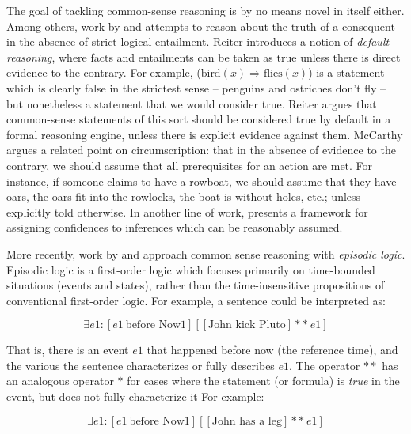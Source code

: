 The goal of tackling common-sense reasoning is by no means novel in
  itself either.
Among others, work by  and 
  attempts to reason about the truth of a consequent in the absence of strict logical entailment.
Reiter introduces a notion of \textit{default reasoning}, where facts and entailments can be
  taken as true unless there is direct evidence to the contrary.
For example,  ($\textrm{bird}(x) \Rightarrow \textrm{flies}(x)$) is a statement which
  is clearly false in the strictest sense -- penguins and ostriches don't fly -- but nonetheless
  a statement that we would consider true.
Reiter argues that common-sense statements of this sort should be considered true by default in
  a formal reasoning engine, unless there is explicit evidence against them.
McCarthy argues a related point on circumscription: that in the absence of evidence to the contrary,
  we should assume that all prerequisites for an action are met.
For instance, if someone claims to have a rowboat, we should assume that they have oars, the oars
  fit into the rowlocks, the boat is without holes, etc.; unless explicitly told otherwise.
In another line of work,  presents a framework for
  assigning confidences to inferences which can be reasonably assumed.

More recently, work by  and
   approach common sense reasoning
  with \textit{episodic logic}.
Episodic logic is a first-order logic which focuses primarily on time-bounded
  situations (events and states), rather than the time-insensitive propositions
  of conventional first-order logic.
For example, a sentence  could be interpreted as:

\begin{equation*}
\exists e1 : [ e1 ~ \textrm{before Now1} ] \left[ [ \textrm{John kick Pluto} ] **~ e1 \right]
\end{equation*}

That is, there is an event $e1$ that happened before now (the reference time), and the various
  the sentence  characterizes or fully describes $e1$.
The operator $**$ has an analogous operator $*$ for cases where the statement (or formula)
  is \textit{true} in the event, but does not fully characterize it
For example:

\begin{equation*}
\exists e1 : [ e1 ~ \textrm{before Now1} ] \left[ [ \textrm{John has a leg} ] **~ e1 \right]
\end{equation*}


